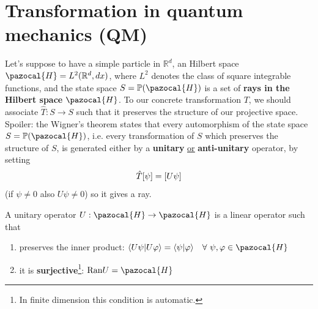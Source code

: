 \documentclass[../main.tex]{subfiles}
\begin{document}
\section[Transformation in QM]{Transformation in quantum mechanics (QM)}
Let's suppose to have a simple particle in $\mathbb{R}^d$, an Hilbert space $\pazocal{H}=L^2(\mathbb{R}^d,dx)$, where $L^2$ denotes the class of square integrable functions, and the state space $S=\mathbb{P}(\pazocal{H})$ is a set of \textbf{rays in the Hilbert space} $\pazocal{H}$. To our concrete transformation $T$, we should associate $\hat{T}:S \rightarrow S$ such that it preserves the structure of our projective space. Spoiler: the Wigner's theorem states that every automorphism of the state space $S=\mathbb{P}(\pazocal{H})$, i.e. every transformation of $S$ which preserves the structure of $S$, is generated either by a \textbf{unitary} \underline{\underline{or}} \textbf{anti-unitary} operator, by setting
\[
\hat{T}\qty[\psi]=\qty[U\psi]
\]
(if $\psi\neq 0$ also $U\psi\neq 0$) so it gives a ray.
\begin{definition}
A unitary operator $U:\pazocal{H}\rightarrow\pazocal{H}$ is a linear operator such that
    \begin{enumerate}
        \item preserves the inner product: $\langle U\psi|U\varphi \rangle=\langle \psi|\varphi \rangle \quad \forall\ \psi,\varphi \in \pazocal{H}$
        \item it is \textbf{surjective}\footnote{In finite dimension this condition is automatic.}:  $\textrm{Ran}U=\pazocal{H}$
    \end{enumerate}
\end{definition}
\end{document}
